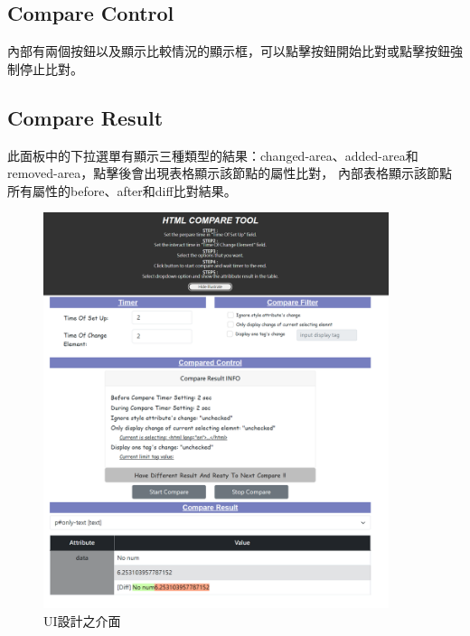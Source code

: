 \subsection{Compare Control}\label{s3.5.4}

內部有兩個按鈕以及顯示比較情況的顯示框，可以點擊按鈕開始比對或點擊按鈕強制停止比對。

\subsection{Compare Result}\label{s3.5.5}

此面板中的下拉選單有顯示三種類型的結果：changed-area、added-area和removed-area，點擊後會出現表格顯示該節點的屬性比對，
內部表格顯示該節點所有屬性的before、after和diff比對結果。

\indent

\begin{figure}[H]
    \centering
    \includegraphics[width=0.9\textwidth]{picture/ch3-UIUX-example.png}
    \caption{UI設計之介面}
    \label{f3.8}
\end{figure}